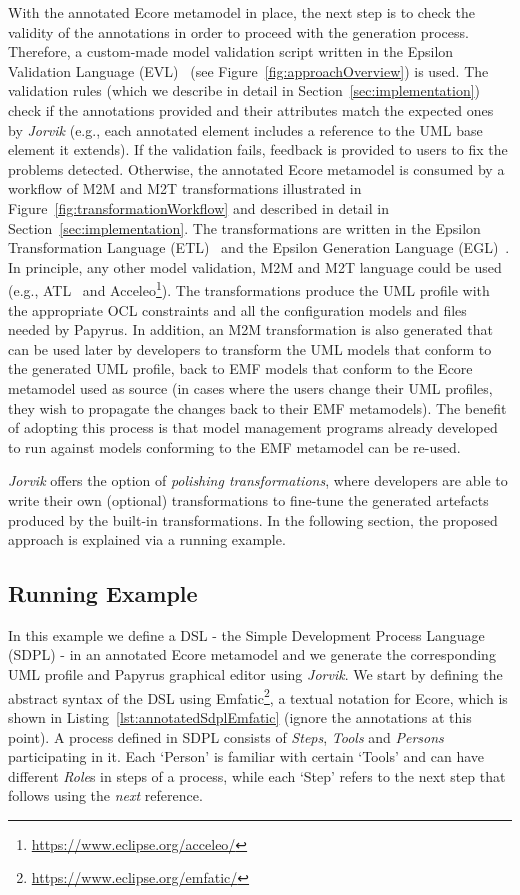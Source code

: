 With the annotated Ecore metamodel in place, the next step is to check the validity of the annotations in order to proceed with the generation process. 
Therefore, a custom-made model validation script written in the Epsilon Validation Language (EVL)~\cite{evlKolovos} (see Figure~\ref{fig:approachOverview}) is used.
The validation rules (which we describe in detail in Section~\ref{sec:implementation}) check if the annotations provided and their attributes match the expected ones by \textit{Jorvik} (e.g., each annotated element includes a reference to the UML base element it extends). 
If the validation fails, feedback is provided to users to fix the problems detected. 
Otherwise, the annotated Ecore metamodel is consumed by a workflow of M2M and M2T  transformations illustrated in Figure~\ref{fig:transformationWorkflow} and described in detail in Section~\ref{sec:implementation}. 
The transformations are written in the Epsilon Transformation Language (ETL)~\cite{Kolovos2008} and the Epsilon Generation Language (EGL)~\cite{rose2008egl}. 
In principle, any other model validation, M2M and M2T language could be used (e.g., ATL~\cite{jouault2006atl} and Acceleo\footnote{\url{https://www.eclipse.org/acceleo/}}). 
The transformations produce the UML profile with the appropriate OCL constraints and all the configuration models and files needed by Papyrus. 
In addition, an M2M transformation is also generated that can be used later by developers to transform the UML models that conform to the generated UML profile, back to EMF models that conform to the Ecore metamodel used as source (in cases where the users change their UML profiles, they wish to propagate the changes back to their EMF metamodels). 
The benefit of adopting this process is that model management programs already developed to run against models conforming to the EMF metamodel can be re-used.

\textit{Jorvik} offers the option of \textit{polishing transformations}, where developers are able to write their own (optional) transformations to fine-tune the generated artefacts produced by the built-in transformations. 
In the following section, the proposed approach is explained via a running example.

\subsection{Running Example}
\label{sec:example}
In this example we define a DSL - the Simple Development Process Language (SDPL) - in an annotated Ecore metamodel and we generate the corresponding UML profile and Papyrus graphical editor using \textit{Jorvik}.
We start by defining the abstract syntax of the DSL using  Emfatic\footnote{\url{https://www.eclipse.org/emfatic/}}, a textual notation for Ecore, which is shown in Listing~\ref{lst:annotatedSdplEmfatic} (ignore the annotations at this point). 
A process defined in SDPL consists of \textit{Steps}, \textit{Tools} and \textit{Persons} participating in it. 
Each `Person' is familiar with certain `Tools' and can have different \textit{Role}s in steps of a process, while each `Step' refers to the next step that follows using the \textit{next} reference.

